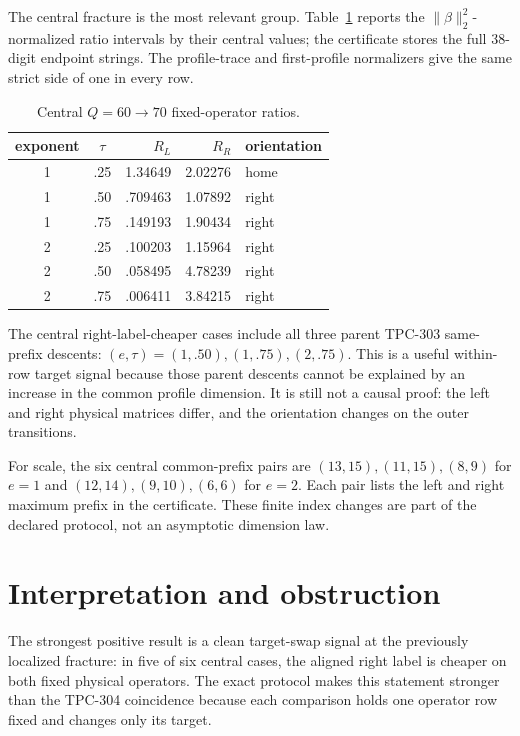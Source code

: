 \documentclass[11pt]{article}
\begin{document}
The central fracture is the most relevant group.  Table~\ref{tab:middle}
reports the $\|\beta\|_2^2$-normalized ratio intervals by their central values;
the certificate stores the full 38-digit endpoint strings.  The profile-trace
and first-profile normalizers give the same strict side of one in every row.

\begin{table}[t]
\centering\small
\caption{Central $Q=60\to70$ fixed-operator ratios.}
\label{tab:middle}
\begin{tabular}{c c r r l}
\toprule
exponent & $\tau$ & $R_L$ & $R_R$ & orientation\\
\midrule
1 & .25 & 1.34649 & 2.02276 & home\\
1 & .50 & .709463 & 1.07892 & right\\
1 & .75 & .149193 & 1.90434 & right\\
2 & .25 & .100203 & 1.15964 & right\\
2 & .50 & .058495 & 4.78239 & right\\
2 & .75 & .006411 & 3.84215 & right\\
\bottomrule
\end{tabular}
\end{table}

The central right-label-cheaper cases include all three parent TPC-303
same-prefix descents: $(e,\tau)=(1,.50),(1,.75),(2,.75)$.  This is a useful
within-row target signal because those parent descents cannot be explained by
an increase in the common profile dimension.  It is still not a causal proof:
the left and right physical matrices differ, and the orientation changes on
the outer transitions.

For scale, the six central common-prefix pairs are
$(13,15),(11,15),(8,9)$ for $e=1$ and $(12,14),(9,10),(6,6)$ for $e=2$.
Each pair lists the left and right maximum prefix in the certificate.  These
finite index changes are part of the declared protocol, not an asymptotic
dimension law.

\section{Interpretation and obstruction}

The strongest positive result is a clean target-swap signal at the previously
localized fracture: in five of six central cases, the aligned right label is
cheaper on both fixed physical operators.  The exact protocol makes this
statement stronger than the TPC-304 coincidence because each comparison holds
one operator row fixed and changes only its target.
\end{document}
